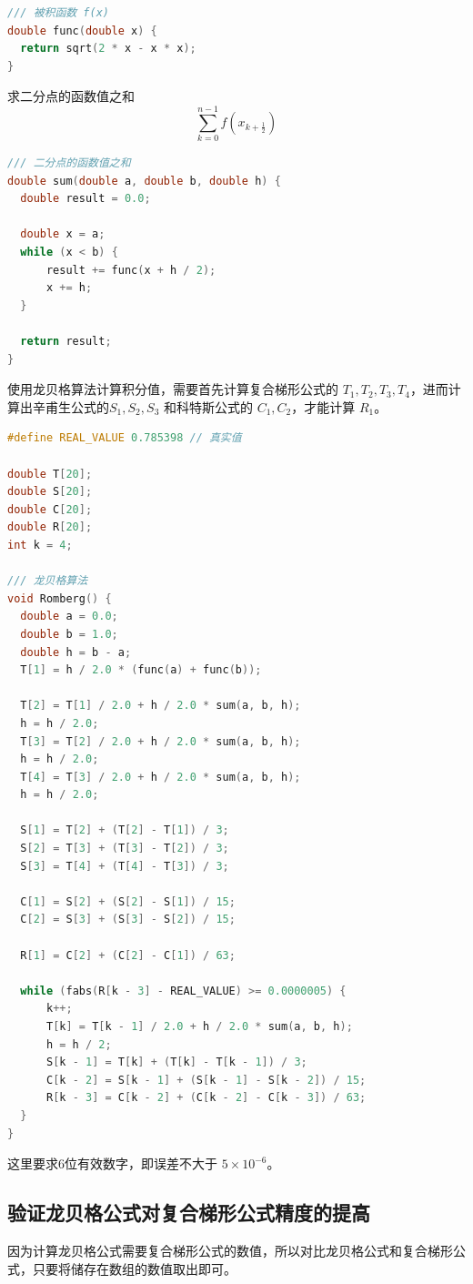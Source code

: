 \documentclass[lang=cn,11pt,a4paper]{elegantpaper}
\begin{document}
\begin{lstlisting}[language=c++]
/// 被积函数 f(x)
double func(double x) {
  return sqrt(2 * x - x * x);
}
\end{lstlisting}

求二分点的函数值之和
$$
  \sum_{k=0}^{n-1} f(x_{k+\frac{1}{2}})
$$
\clearpage
\begin{lstlisting}[language=c++]
/// 二分点的函数值之和
double sum(double a, double b, double h) {
  double result = 0.0;
  
  double x = a;
  while (x < b) {
      result += func(x + h / 2);
      x += h;
  }

  return result;
}
\end{lstlisting}

使用龙贝格算法计算积分值，需要首先计算复合梯形公式的 $T_1, T_2, T_3, T_4$，进而计算出辛甫生公式的$S_1, S_2, S_3$ 和科特斯公式的 $C_1, C_2$，才能计算 $R_1$。
\begin{lstlisting}[language=c++]
#define REAL_VALUE 0.785398 // 真实值

double T[20];
double S[20];
double C[20];
double R[20];
int k = 4;

/// 龙贝格算法
void Romberg() {
  double a = 0.0;
  double b = 1.0;
  double h = b - a;
  T[1] = h / 2.0 * (func(a) + func(b));

  T[2] = T[1] / 2.0 + h / 2.0 * sum(a, b, h);
  h = h / 2.0;
  T[3] = T[2] / 2.0 + h / 2.0 * sum(a, b, h);
  h = h / 2.0;
  T[4] = T[3] / 2.0 + h / 2.0 * sum(a, b, h);
  h = h / 2.0;

  S[1] = T[2] + (T[2] - T[1]) / 3;
  S[2] = T[3] + (T[3] - T[2]) / 3;
  S[3] = T[4] + (T[4] - T[3]) / 3;

  C[1] = S[2] + (S[2] - S[1]) / 15;
  C[2] = S[3] + (S[3] - S[2]) / 15;

  R[1] = C[2] + (C[2] - C[1]) / 63;

  while (fabs(R[k - 3] - REAL_VALUE) >= 0.0000005) {
      k++;
      T[k] = T[k - 1] / 2.0 + h / 2.0 * sum(a, b, h);
      h = h / 2;
      S[k - 1] = T[k] + (T[k] - T[k - 1]) / 3;
      C[k - 2] = S[k - 1] + (S[k - 1] - S[k - 2]) / 15;
      R[k - 3] = C[k - 2] + (C[k - 2] - C[k - 3]) / 63;
  }
}
\end{lstlisting}

这里要求6位有效数字，即误差不大于 $5 \times 10^{-6}$。

\subsection{验证龙贝格公式对复合梯形公式精度的提高}
因为计算龙贝格公式需要复合梯形公式的数值，所以对比龙贝格公式和复合梯形公式，只要将储存在数组的数值取出即可。
\end{document}
